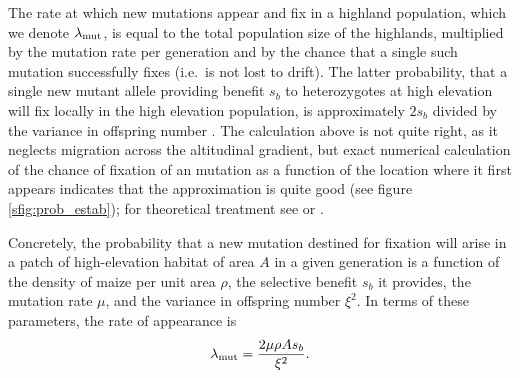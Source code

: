 The rate at which new mutations appear and fix in a highland population, which we denote $\lambda_{\text{mut}}$,
is equal to the total population size of the highlands, multiplied by the mutation rate per generation
and by the chance that a single such mutation successfully fixes
(i.e.\ is not lost to drift).
The latter probability, that a single new mutant allele providing benefit $s_b$ to heterozygotes at high elevation
will fix locally in the high elevation population,
is approximately $2s_b$ divided by the variance in offspring number \citep{jagers1975branching}.
The calculation above is not quite right, as it neglects migration across the altitudinal gradient,
but exact numerical calculation of the chance of fixation of an mutation as a function of the location where it first appears
indicates that the approximation is quite good (see figure \ref{sfig:prob_estab});
for theoretical treatment see \citet{pollak1966survival} or \citet{barton1987establishment}.


Concretely, the probability that a new mutation destined for fixation
will arise in a patch of high-elevation habitat of area $A$ in a given generation
is a function of the density of maize per unit area $\rho$,
the selective benefit $s_b$ it provides,
the mutation rate $\mu$,
and the variance in offspring number $\xi^2$.
In terms of these parameters, the rate of appearance is
\begin{align} \label{eqn:mutrate}
  \lambda_{\text{mut}} = \frac{2 \mu \rho A s_b}{\xi^2} .
\end{align}

